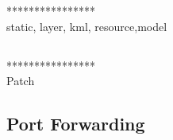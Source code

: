****************\\
static, layer, kml, resource,model\\

\subsection{}

****************\\
Patch\\

\subsection{Port Forwarding}

